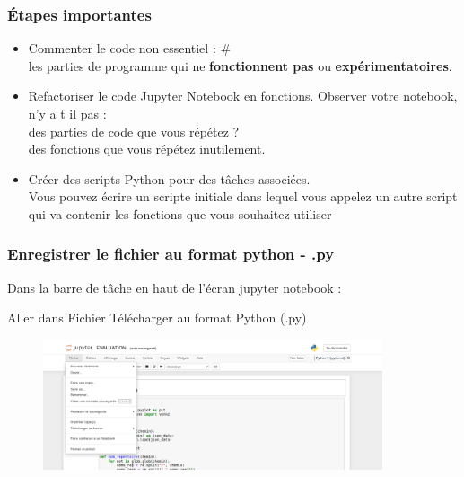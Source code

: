 \begin{frame}
 \frametitle{Étapes importantes}
\begin{itemize}
\item Commenter le code non essentiel : \# \\
 les parties de programme qui ne \textbf{fonctionnent pas} ou \textbf{expérimentatoires}.

\pause

\item Refactoriser le code Jupyter Notebook en fonctions. Observer votre notebook, n'y a t il pas :\\
 des parties de code que vous répétez ?\\
 des fonctions que vous répétez inutilement.

\pause

\item Créer des scripts Python pour des tâches associées.\\
 Vous pouvez écrire un scripte initiale dans lequel vous appelez un autre script qui va contenir les fonctions que vous souhaitez utiliser
\end{itemize} 
\end{frame}


\begin{frame}
  \frametitle{Enregistrer le fichier au format python - .py}
  Dans la barre de tâche en haut de l'écran jupyter notebook :
  
  
  Aller dans Fichier   Télécharger au format   Python (.py)
  
  \begin{figure}
  \includegraphics[width=10cm]{images/ynpb_convert_py.png}
  \end{figure}
 
\end{frame}



\begin{frame}
  
\end{frame}

